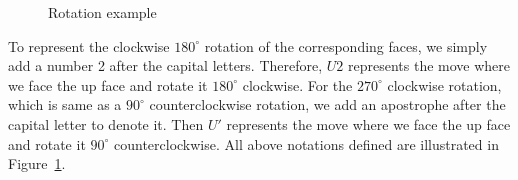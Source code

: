 \begin{figure}[ht]
    \centering
    \begin{minipage}{0.9\textwidth}
        \centering
        \RubikCubeSolvedWY
        \quad{}\quad
        \quad{}\quad
        \vspace*{10px}
    \end{minipage}
    \begin{minipage}{0.9\textwidth}
        \centering
        \RubikCubeSolvedWY
        \quad
        \quad
    \end{minipage}
    \caption{Rotation example}\label{fig:cube-rotation-example}
\end{figure}
\par To represent the clockwise $180^\circ$ rotation of the corresponding faces, we simply add a number 2 after the capital letters. Therefore, $U2$ represents the move where we face the up face and rotate it $180^\circ$ clockwise. For the $270^\circ$ clockwise rotation, which is same as a $90^\circ$ counterclockwise rotation, we add an apostrophe after the capital letter to denote it. Then $U'$ represents the move where we face the up face and rotate it $90^\circ$ counterclockwise. All above notations defined are illustrated in Figure~\ref{fig:cube-rotation-example}.

